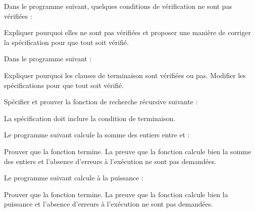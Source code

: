 





Dans le programme suivant, quelques conditions de vérification ne sont pas
vérifiées :




Expliquer pourquoi elles ne sont pas vérifiées et proposer une manière de
corriger la spécification pour que tout soit vérifié.




Dans le programme suivant :




Expliquer pourquoi les clauses de terminaison sont vérifiées ou pas. Modifier
les spécifications pour que tout soit vérifié.




Spécifier et prouver la fonction de recherche récursive suivante :




La spécification doit inclure la condition de terminaison.




Le programme suivant calcule la somme des entiers entre  et
 :




Prouver que la fonction termine. La preuve que la fonction calcule bien la
somme des entiers et l'absence d'erreurs à l'exécution ne sont pas demandées.




Le programme suivant calcule  à la puissance  :




Prouver que la fonction termine. La preuve que la fonction calcule bien la
puissance et l'absence d'erreurs à l'exécution ne sont pas demandées.
